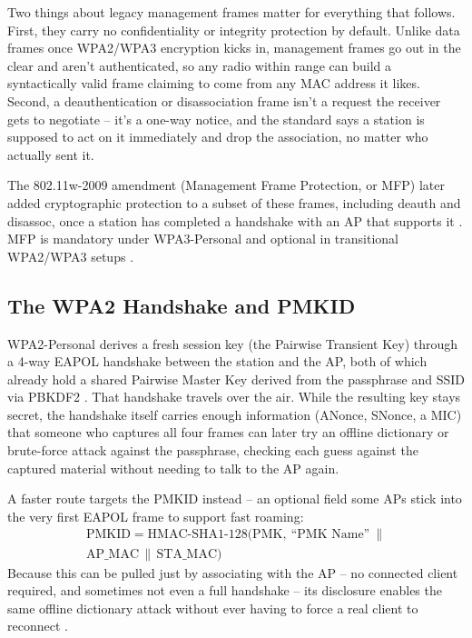 \documentclass[conference]{IEEEtran}
\begin{document}
Two things about legacy management frames matter for everything that follows. First, they carry no confidentiality or integrity protection by default. Unlike data frames once WPA2/WPA3 encryption kicks in, management frames go out in the clear and aren't authenticated, so any radio within range can build a syntactically valid frame claiming to come from any MAC address it likes. Second, a deauthentication or disassociation frame isn't a request the receiver gets to negotiate -- it's a one-way notice, and the standard says a station is supposed to act on it immediately and drop the association, no matter who actually sent it.

The 802.11w-2009 amendment (Management Frame Protection, or MFP) later added cryptographic protection to a subset of these frames, including deauth and disassoc, once a station has completed a handshake with an AP that supports it \cite{ieee80211w}. MFP is mandatory under WPA3-Personal and optional in transitional WPA2/WPA3 setups \cite{wpa3spec}.

\subsection{The WPA2 Handshake and PMKID}

WPA2-Personal derives a fresh session key (the Pairwise Transient Key) through a 4-way EAPOL handshake between the station and the AP, both of which already hold a shared Pairwise Master Key derived from the passphrase and SSID via PBKDF2 \cite{ieee80211i}. That handshake travels over the air. While the resulting key stays secret, the handshake itself carries enough information (ANonce, SNonce, a MIC) that someone who captures all four frames can later try an offline dictionary or brute-force attack against the passphrase, checking each guess against the captured material without needing to talk to the AP again.

A faster route targets the PMKID instead -- an optional field some APs stick into the very first EAPOL frame to support fast roaming:
\begin{equation}
\begin{split}
\text{PMKID} = \text{HMAC-SHA1-128}\big(\text{PMK},\ \text{``PMK Name''}\ \| \\
\text{AP\_MAC} \,\|\, \text{STA\_MAC}\big)
\end{split}
\end{equation}
Because this can be pulled just by associating with the AP -- no connected client required, and sometimes not even a full handshake -- its disclosure enables the same offline dictionary attack without ever having to force a real client to reconnect \cite{pmkidhashcat}.
\end{document}
